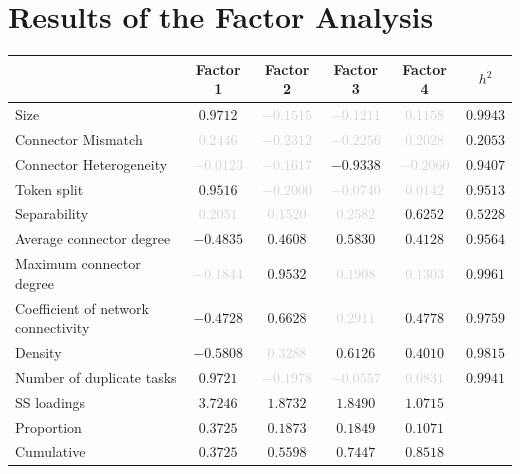 \documentclass[a4paper]{article}
\begin{document}
\section*{Results of the Factor Analysis}
\begin{center}
\begin{tabular}{lccccc}
\toprule
 & Factor 1 & Factor 2 & Factor 3 & Factor 4 & $h^2$ \\
\midrule
Size & $\mathbf{0.9712}$ & \textcolor{lightgray}{$-0.1515$} & \textcolor{lightgray}{$-0.1211$} & \textcolor{lightgray}{$0.1158$} & $0.9943$ \\
Connector Mismatch & \textcolor{lightgray}{$0.2446$} & \textcolor{lightgray}{$-0.2312$} & \textcolor{lightgray}{$-0.2256$} & \textcolor{lightgray}{$0.2028$} & $0.2053$ \\
Connector Heterogeneity & \textcolor{lightgray}{$-0.0123$} & \textcolor{lightgray}{$-0.1617$} & $\mathbf{-0.9338}$ & \textcolor{lightgray}{$-0.2060$} & $0.9407$ \\
Token split & $\mathbf{0.9516}$ & \textcolor{lightgray}{$-0.2000$} & \textcolor{lightgray}{$-0.0740$} & \textcolor{lightgray}{$0.0142$} & $0.9513$ \\
Separability & \textcolor{lightgray}{$0.2051$} & \textcolor{lightgray}{$0.1520$} & \textcolor{lightgray}{$0.2582$} & $\mathbf{0.6252}$ & $0.5228$ \\
Average connector degree & $\mathbf{-0.4835}$ & $\mathbf{0.4608}$ & $\mathbf{0.5830}$ & $0.4128$ & $0.9564$ \\
Maximum connector degree & \textcolor{lightgray}{$-0.1844$} & $\mathbf{0.9532}$ & \textcolor{lightgray}{$0.1908$} & \textcolor{lightgray}{$0.1303$} & $0.9961$ \\
Coefficient of network connectivity & $-0.4728$ & $\mathbf{0.6628}$ & \textcolor{lightgray}{$0.2911$} & $0.4778$ & $0.9759$ \\
Density & $\mathbf{-0.5808}$ & \textcolor{lightgray}{$0.3288$} & $\mathbf{0.6126}$ & $0.4010$ & $0.9815$ \\
Number of duplicate tasks & $\mathbf{0.9721}$ & \textcolor{lightgray}{$-0.1978$} & \textcolor{lightgray}{$-0.0557$} & \textcolor{lightgray}{$0.0831$} & $0.9941$ \\
\midrule
SS loadings & $3.7246$ & $1.8732$ & $1.8490$ & $1.0715$ & \\
Proportion & $0.3725$ & $0.1873$ & $0.1849$ & $0.1071$ & \\
Cumulative & $0.3725$ & $0.5598$ & $0.7447$ & $0.8518$ & \\
\bottomrule
\end{tabular}
\end{center}
\end{document}
